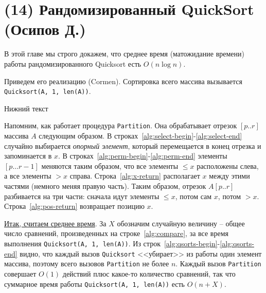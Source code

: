 \section{(14) Рандомизированный QuickSort (Осипов Д.)}

В этой главе мы строго докажем, что среднее время (матожидание времени) работы рандомизированного Quicksort есть $O(n\log n)$.

Приведем его реализацию (Cormen). Сортировка всего массива вызывается \texttt{Quicksort(A, 1, len(A))}.

\begin{algorithm}[H]
	\caption{Нижний текст}
	\DontPrintSemicolon
	\;
\end{algorithm}


Напомним, как работает процедура \texttt{Partition}. Она обрабатывает отрезок $[p..r]$ массива $A$ следующим образом.  В строках~\ref{alg:select-begin}-\ref{alg:select-end} случайно выбирается \textit{опорный элемент}, который перемещается в конец отрезка и запоминается в $x$. В строках~\ref{alg:perm-begin}-\ref{alg:perm-end} элементы $[p\ldots r-1]$ меняются таким образом, что все элементы $\leq x$ расположены слева, а все элементы $> x$ справа. Строка~\ref{alg:x-return} располагает $x$ между этими частями (немного меняя правую часть). Таким образом, отрезок $A[p..r]$ разбивается на три части: сначала идут элементы $\leq x$, потом сам $x$, потом $>x$. Строка~\ref{alg:pos-return} возвращает позицию $x$.

\underline{Итак, считаем среднее время}. За $X$ обозначим случайную величину -- общее число сравнений, произведенных на строке~\ref{alg:compare}, за все время выполнения \texttt{Quicksort(A, 1, len(A))}. Из строк~\ref{alg:qsorts-begin}-\ref{alg:qsorts-end} видно, что каждый вызов \texttt{Quicksort} <<убирает>> из работы один элемент массива, поэтому всего вызовов \texttt{Partition} не более $n$. Каждый вызов \texttt{Partition} совершает $O(1)$ действий плюс какое-то количество сравнений, так что суммарное время работы \texttt{Quicksort(A, 1, len(A))} есть $O(n+X)$.

